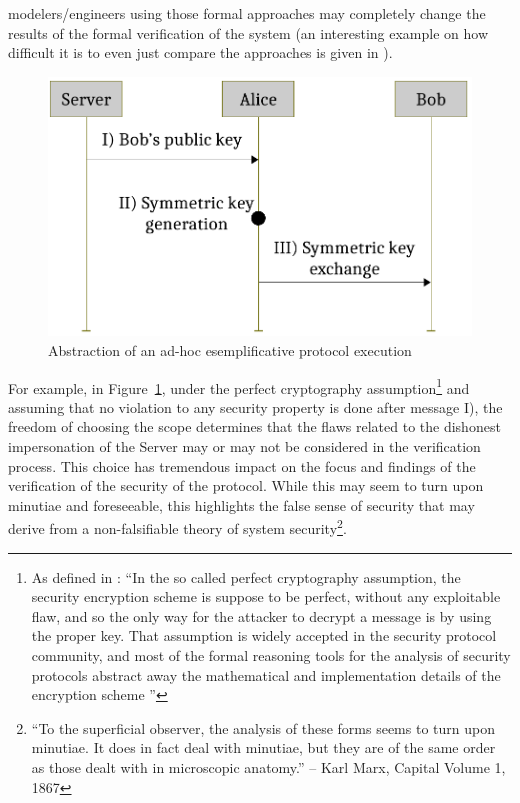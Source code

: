 \documentclass[conference]{IEEEtran}
\begin{document}
modelers/engineers using those formal approaches may completely change the
results of the formal verification of the system (an interesting example on how
difficult it is to even just compare the approaches is given in
\cite{Cremers2009comparing}). 
\begin{figure}[t]
	\centering
	\includegraphics[width=.7\columnwidth]{protocol-example.pdf}
	\caption{Abstraction of an ad-hoc esemplificative protocol execution}
	\label{fig:protocol-example}
\end{figure}
For example, in Figure~\ref{fig:protocol-example}, under the perfect
cryptography assumption\footnote{As defined in \cite{Rocchetto2016cpdy}: ``In
the so called perfect cryptography assumption, the security encryption scheme
is suppose to be perfect, without any exploitable flaw, and so the only way for
the attacker to decrypt a message is by using the proper key. That assumption
is widely accepted in the security protocol community, and most of the formal
reasoning tools for the analysis of security protocols abstract away the
mathematical and implementation details of the encryption scheme
\cite{Turuani2006clatse,Basin2005ofmc,Armando2016satmc,Rocchetto2017interpolation}''}
and assuming that no violation to any security property is done after message
I), the freedom of choosing the scope
determines that the flaws related to the dishonest impersonation of the Server
may or may not be considered in the verification process.  This choice has
tremendous impact on the focus and findings of the verification of the security
of the protocol.  While this may seem to turn upon minutiae and foreseeable,
this highlights the false sense of security that may derive from a
non-falsifiable theory of system security\footnote{``To the superficial
observer, the analysis of these forms seems to turn upon minutiae. It does in
fact deal with minutiae, but they are of the same order as those dealt with in
microscopic anatomy.'' -- Karl Marx, Capital Volume 1, 1867}.
\end{document}
